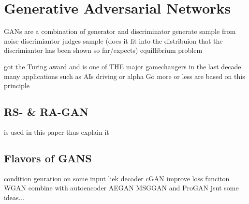 \section{Generative Adversarial Networks}
GANs \citeauthor{GAN} \cite{GAN} are a combination of generator and discriminator
generate sample from noise
discrimiantor judges sample (does it fit into the distribuion that the discrimiantor has been shown so far/expects)
equillibrium problem

got the Turing award and is one of THE major gamechangers in the last decade
many applications such as AIs driving or alpha Go more or less are based on this principle

\subsection{RS- \& RA-GAN}
is used in this paper thus explain it


\subsection{Flavors of GANS}
condition genration on some input liek decoder cGAN
improve loss funciton WGAN
combine with autoencoder AEGAN
MSGGAN and ProGAN
jsut some ideas...


